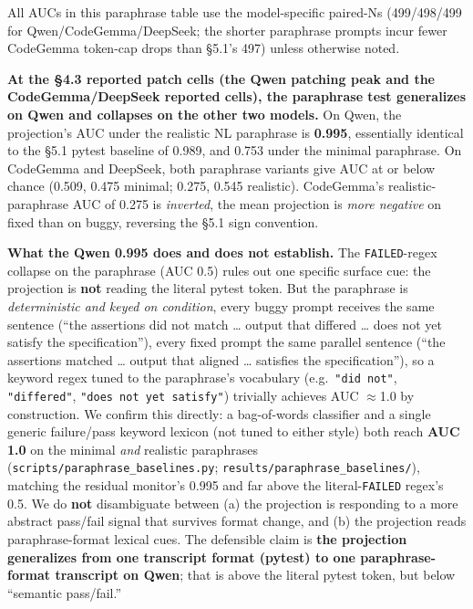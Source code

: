 \documentclass[
  11pt,
  a4paper]{article}
\begin{document}
All AUCs in this paraphrase table use the model-specific paired-Ns
(499/498/499 for Qwen/CodeGemma/DeepSeek; the shorter paraphrase prompts
incur fewer CodeGemma token-cap drops than \S{}5.1's 497) unless otherwise
noted.

\textbf{At the \S{}4.3 reported patch cells (the Qwen patching peak and the
CodeGemma/DeepSeek reported cells), the paraphrase test generalizes on
Qwen and collapses on the other two models.} On Qwen, the projection's
AUC under the realistic NL paraphrase is \textbf{0.995}, essentially
identical to the \S{}5.1 pytest baseline of 0.989, and 0.753 under the
minimal paraphrase. On CodeGemma and DeepSeek, both paraphrase variants
give AUC at or below chance (0.509, 0.475 minimal; 0.275, 0.545
realistic). CodeGemma's realistic-paraphrase AUC of 0.275 is
\emph{inverted}, the mean projection is \emph{more negative} on fixed
than on buggy, reversing the \S{}5.1 sign convention.

\textbf{What the Qwen 0.995 does and does not establish.} The
\texttt{FAILED}-regex collapse on the paraphrase (AUC 0.5) rules out one
specific surface cue: the projection is \textbf{not} reading the literal
pytest token. But the paraphrase is \emph{deterministic and keyed on
condition}, every buggy prompt receives the same sentence (``the
assertions did not match \ldots{} output that differed \ldots{} does not
yet satisfy the specification''), every fixed prompt the same parallel
sentence (``the assertions matched \ldots{} output that aligned \ldots{}
satisfies the specification''), so a keyword regex tuned to the
paraphrase's vocabulary (e.g.~\texttt{"did\ not"}, \texttt{"differed"},
\texttt{"does\ not\ yet\ satisfy"}) trivially achieves AUC \ensuremath{\approx}1.0 by
construction. We confirm this directly: a bag-of-words classifier and a
single generic failure/pass keyword lexicon (not tuned to either style)
both reach \textbf{AUC 1.0} on the minimal \emph{and} realistic
paraphrases (\texttt{scripts/paraphrase\_baselines.py};
\texttt{results/paraphrase\_baselines/}), matching the residual
monitor's 0.995 and far above the literal-\texttt{FAILED} regex's 0.5.
We do \textbf{not} disambiguate between (a) the projection is responding
to a more abstract pass/fail signal that survives format change, and (b)
the projection reads paraphrase-format lexical cues. The defensible
claim is \textbf{the projection generalizes from one transcript format
(pytest) to one paraphrase-format transcript on Qwen}; that is above the
literal pytest token, but below ``semantic pass/fail.''
\end{document}
